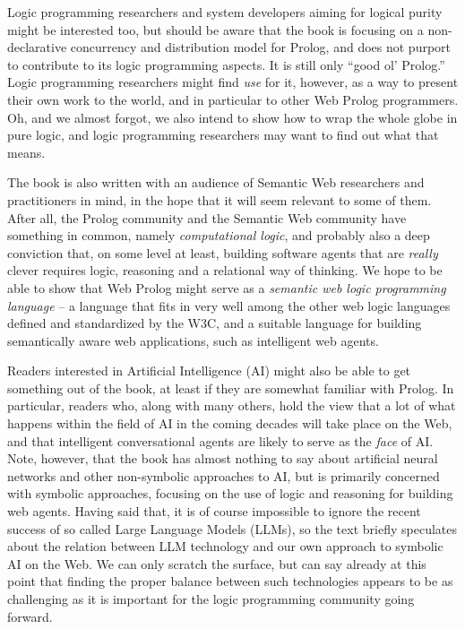 Logic programming researchers and system developers aiming for logical purity might be interested too, but should be aware that the book is focusing on a non-declarative concurrency and distribution model for Prolog, and does not purport to contribute to its logic programming aspects. It is still only ``good ol' Prolog.'' Logic programming researchers might find \textit{use} for it, however, as a way to present their own work to the world, and in particular to other Web Prolog programmers. Oh, and we almost forgot, we also intend to show how to wrap the whole globe in pure logic, and logic programming researchers may want to find out what that means.

The book is also written with an audience of Semantic Web researchers and practitioners in mind, in the hope that it will seem relevant to some of them. After all, the Prolog community and the Semantic Web community have something in common, namely \textit{computational logic}, and probably also a deep conviction that, on some level at least, building software agents that are \textit{really} clever requires logic, reasoning and a relational way of thinking. %
We hope to be able to show that Web Prolog might serve as a \textit{semantic web logic programming language} --  a language that fits in very well among the other web logic languages defined and standardized by the W3C, and a suitable language for building semantically aware web applications, such as intelligent web agents.

Readers interested in Artificial Intelligence (AI) might also be able to get something out of the book, at least if they are somewhat familiar with Prolog. In particular, readers who, along with many others, hold the view that a lot of what happens within the field of AI in the coming decades will take place on the Web, and that intelligent conversational agents are likely to serve as the \textit{face} of AI. Note, however, that the book has almost nothing to say about artificial neural networks and other non-symbolic approaches to AI, but is primarily concerned with symbolic approaches, focusing on the use of logic and reasoning for building web agents. Having said that, it is of course impossible to ignore the recent success of so called Large Language Models (LLMs), so the text briefly speculates about the relation between LLM technology and our own approach to symbolic AI on the Web. We can only scratch the surface, but can say already at this point that finding the proper balance between such technologies appears to be as challenging as it is important for the logic programming community going forward. 

